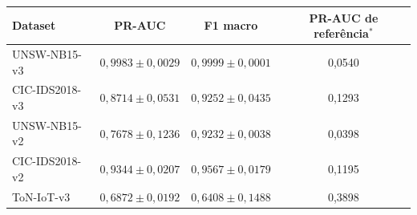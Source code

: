 \begin{tabular}{lccc}
\toprule
Dataset & PR-AUC & F1 macro & \makecell{PR-AUC de\\referência$^\ast$} \\
\midrule
UNSW-NB15-v3 & $0,9983 \pm 0,0029$ & $0,9999 \pm 0,0001$ & 0,0540 \\
CIC-IDS2018-v3 & $0,8714 \pm 0,0531$ & $0,9252 \pm 0,0435$ & 0,1293 \\
UNSW-NB15-v2 & $0,7678 \pm 0,1236$ & $0,9232 \pm 0,0038$ & 0,0398 \\
CIC-IDS2018-v2 & $0,9344 \pm 0,0207$ & $0,9567 \pm 0,0179$ & 0,1195 \\
\midrule
ToN-IoT-v3 & $0,6872 \pm 0,0192$ & $0,6408 \pm 0,1488$ & 0,3898 \\
\bottomrule
\end{tabular}

